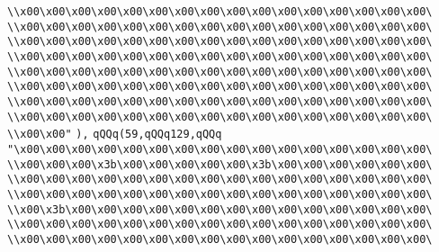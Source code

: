 \verb|\\x00\x00\x00\x00\x00\x00\x00\x00\x00\x00\x00\x00\x00\x00\x00\x00\|\newline
\verb|\\x00\x00\x00\x00\x00\x00\x00\x00\x00\x00\x00\x00\x00\x00\x00\x00\|\newline
\verb|\\x00\x00\x00\x00\x00\x00\x00\x00\x00\x00\x00\x00\x00\x00\x00\x00\|\newline
\verb|\\x00\x00\x00\x00\x00\x00\x00\x00\x00\x00\x00\x00\x00\x00\x00\x00\|\newline
\verb|\\x00\x00\x00\x00\x00\x00\x00\x00\x00\x00\x00\x00\x00\x00\x00\x00\|\newline
\verb|\\x00\x00\x00\x00\x00\x00\x00\x00\x00\x00\x00\x00\x00\x00\x00\x00\|\newline
\verb|\\x00\x00\x00\x00\x00\x00\x00\x00\x00\x00\x00\x00\x00\x00\x00\x00\|\newline
\verb|\\x00\x00\x00\x00\x00\x00\x00\x00\x00\x00\x00\x00\x00\x00\x00\x00\|\newline
\verb|\\x00\x00"|\newline
\verb|),|\newline
\verb|qQQq(59,qQQq129,qQQq|\newline
\verb|"\x00\x00\x00\x00\x00\x00\x00\x00\x00\x00\x00\x00\x00\x00\x00\x00\|\newline
\verb|\\x00\x00\x00\x3b\x00\x00\x00\x00\x00\x3b\x00\x00\x00\x00\x00\x00\|\newline
\verb|\\x00\x00\x00\x00\x00\x00\x00\x00\x00\x00\x00\x00\x00\x00\x00\x00\|\newline
\verb|\\x00\x00\x00\x00\x00\x00\x00\x00\x00\x00\x00\x00\x00\x00\x00\x00\|\newline
\verb|\\x00\x3b\x00\x00\x00\x00\x00\x00\x00\x00\x00\x00\x00\x00\x00\x00\|\newline
\verb|\\x00\x00\x00\x00\x00\x00\x00\x00\x00\x00\x00\x00\x00\x00\x00\x00\|\newline
\verb|\\x00\x00\x00\x00\x00\x00\x00\x00\x00\x00\x00\x00\x00\x00\x00\x00\|\newline

